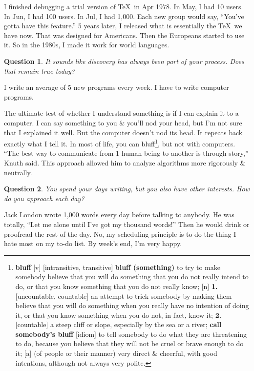 \documentclass[oneside]{book}
\numberwithin{equation}{section}
\newtheorem{question}{Question}[chapter]
\begin{document}
I finished debugging a trial version of \TeX\ in Apr 1978. In May, I had 10 users. In Jun, I had 100 users. In Jul, I had 1,000. Each new group would say, ``You've gotta have this feature.'' 5 years later, I released what is essentially the \TeX\ we have now. That was designed for Americans. Then the Europeans started to use it. So in the 1980s, I made it work for world languages.

\begin{question}
	It sounds like discovery has always been part of your process. Does that remain true today?
\end{question}
I write an average of 5 new programs every week.  I have to write computer programs.

The ultimate test of whether I understand something is if I can explain it to a computer. I can say something to you \& you'll nod your head, but I'm not sure that I explained it well. But the computer doesn't nod its head. It repeats back exactly what I tell it. In most of life, you can bluff\footnote{\textbf{bluff} [v] [intransitive, transitive] \textbf{bluff (something)} to try to make somebody believe that you will do something that you do not really intend to do, or that you know something that you do not really know; [n] \textbf{1.} [uncountable, countable] an attempt to trick somebody by making them believe that you will do something when you really have no intention of doing it, or that you know something when you do not, in fact, know it; \textbf{2.} [countable] a steep cliff or slope, especially by the sea or a river; \textbf{call somebody's bluff} [idiom] to tell somebody to do what they are threatening to do, because you believe that they will not be cruel or brave enough to do it; [a] (of people or their manner) very direct \& cheerful, with good intentions, although not always very polite.}, but not with computers. \textsf{``The best way to communicate from 1 human being to another is through story,'' Knuth said. This approach allowed him to analyze algorithms more rigorously \& neutrally.}

\begin{question}
	You spend your days writing, but you also have other interests. How do you approach each day?
\end{question}
Jack London wrote 1,000 words every day before talking to anybody. He was totally, ``Let me alone until I've got my thousand words!'' Then he would drink or proofread the rest of the day. No, my scheduling principle is to do the thing I hate most on my to-do list. By week's end, I'm very happy.
\end{document}
